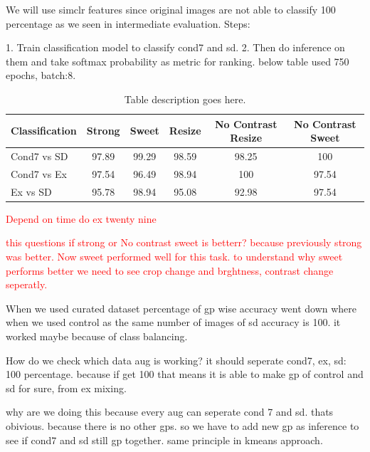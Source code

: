 We will use simclr features since original images are not able to classify 100 percentage as we seen in intermediate evaluation.
Steps:

1. Train classification model to classify cond7 and sd. 
2. Then do inference on them and take softmax probability as metric for ranking.
below table used 750 epochs, batch:8.
\begin{table}[H]
  \centering
  \begin{tabular}{@{}lccccc@{}}
  \toprule
  \textbf{Classification} & \textbf{Strong} & \textbf{Sweet} & \textbf{Resize} & \textbf{No Contrast Resize} & \textbf{No Contrast Sweet} \\ \midrule
  Cond7 vs SD             & 97.89           & 99.29          & 98.59           & 98.25                       & 100                        \\
  Cond7 vs Ex             & 97.54               & 96.49              & 98.94               & 100                           &   97.54                        \\
  Ex vs SD             & 95.78               & 98.94              & 95.08               & 92.98                           & 97.54                         \\ \bottomrule
  \end{tabular}
  \caption{Table description goes here.}
  \label{tab:ranking softmax}
\end{table}

\textcolor{red}{Depend on time do ex twenty nine}
  
\textcolor{red}{this questions if strong or No contrast sweet is betterr? because previously strong was better. Now sweet performed well for this task. 
to understand why sweet performs better we need to see crop change and brghtness, contrast change seperatly.}

When we used curated dataset percentage of gp wise accuracy went down where when we used control as the same number of images of sd accuracy is 100. 
it worked maybe because of class balancing.

How do we check which data aug is working?
it should seperate cond7, ex, sd: 100 percentage. because if get 100 that means it is able to make gp of control and sd for sure, from ex mixing.

why are we doing this because every aug can  seperate cond 7 and sd. thats obivious. because there is no other gps. so we have to add new gp as inference to see if 
cond7 and sd still gp together. same principle in kmeans approach.

